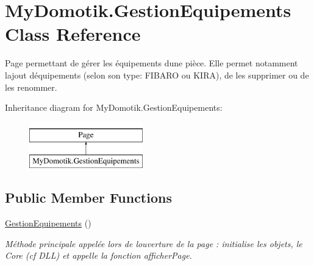 \hypertarget{class_my_domotik_1_1_gestion_equipements}{}\section{My\+Domotik.\+Gestion\+Equipements Class Reference}
\label{class_my_domotik_1_1_gestion_equipements}


Page permettant de gérer les équipements d\textquotesingle{}une pièce. Elle permet notamment l\textquotesingle{}ajout d\textquotesingle{}équipements (selon son type\+: F\+I\+B\+A\+RO ou K\+I\+RA), de les supprimer ou de les renommer.  


Inheritance diagram for My\+Domotik.\+Gestion\+Equipements\+:\begin{figure}[H]
\begin{center}
\leavevmode
\includegraphics[height=2.000000cm]{class_my_domotik_1_1_gestion_equipements}
\end{center}
\end{figure}
\subsection*{Public Member Functions}
\begin{DoxyCompactItemize}
\item 
\hyperlink{class_my_domotik_1_1_gestion_equipements_a8f0c0227eabb6ef595b129c292a833d9}{Gestion\+Equipements} ()
\begin{DoxyCompactList}\small\item\em Méthode principale appelée lors de l\textquotesingle{}ouverture de la page \+: initialise les objets, le Core (cf D\+LL) et appelle la fonction afficher\+Page. \end{DoxyCompactList}\end{DoxyCompactItemize}

